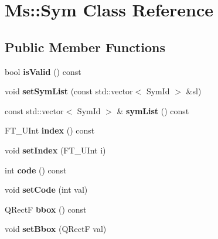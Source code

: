 \hypertarget{class_ms_1_1_sym}{}\section{Ms\+:\+:Sym Class Reference}
\label{class_ms_1_1_sym}
\subsection*{Public Member Functions}
\begin{DoxyCompactItemize}
\item 
\mbox{\label{class_ms_1_1_sym_ab88059cd022a6534b6cfbf0a3da11681}} 
bool {\bfseries is\+Valid} () const
\item 
\mbox{\label{class_ms_1_1_sym_ada6db5652c1394e4701825abc33fa225}} 
void {\bfseries set\+Sym\+List} (const std\+::vector$<$ Sym\+Id $>$ \&sl)
\item 
\mbox{\label{class_ms_1_1_sym_a486d313b74f6e879d5d7cda6b9749eea}} 
const std\+::vector$<$ Sym\+Id $>$ \& {\bfseries sym\+List} () const
\item 
\mbox{\label{class_ms_1_1_sym_ac58fa98a85f0dbd7e26ca42e990d3fdb}} 
F\+T\+\_\+\+U\+Int {\bfseries index} () const
\item 
\mbox{\label{class_ms_1_1_sym_a70594d6df9c99e0633d74821dac3f7e0}} 
void {\bfseries set\+Index} (F\+T\+\_\+\+U\+Int i)
\item 
\mbox{\label{class_ms_1_1_sym_af1ef3fbffed66900ff27bf6d809e023a}} 
int {\bfseries code} () const
\item 
\mbox{\label{class_ms_1_1_sym_a92c6f28031a240785387801f8ffe32b4}} 
void {\bfseries set\+Code} (int val)
\item 
\mbox{\label{class_ms_1_1_sym_ac688000acaab1a1e50c75d841ab30925}} 
Q\+RectF {\bfseries bbox} () const
\item 
\mbox{\label{class_ms_1_1_sym_a1b0de6026a51b3139fcfa76068d9e083}} 
void {\bfseries set\+Bbox} (Q\+RectF val)
\item 

\end{DoxyCompactItemize}
